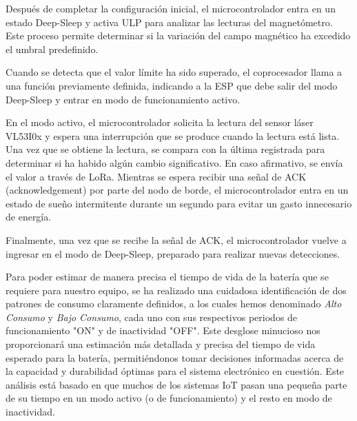 
Después de completar la configuración inicial, el microcontrolador entra en un estado
Deep-Sleep y activa ULP para analizar las lecturas del magnetómetro. Este proceso
permite determinar si la variación del campo magnético ha excedido el umbral predefinido.


Cuando se detecta que el valor límite ha sido superado, el coprocesador llama a una
función previamente definida, indicando a la ESP que debe salir del modo Deep-Sleep y
entrar en modo de funcionamiento activo.

En el modo activo, el microcontrolador solicita la lectura del sensor láser VL53I0x y
espera una interrupción que se produce cuando la lectura está lista. Una vez que se
obtiene la lectura, se compara con la última registrada para determinar si ha habido
algún cambio significativo. En caso afirmativo, se envía el valor a través de LoRa.
Mientras se espera recibir una señal de ACK (acknowledgement) por parte del nodo de
borde, el microcontrolador entra en un estado de sueño intermitente durante un segundo
para evitar un gasto innecesario de energía.

Finalmente, una vez que se recibe la señal de ACK, el microcontrolador vuelve a ingresar
en el modo de Deep-Sleep, preparado para realizar nuevas detecciones.

Para poder estimar de manera precisa el tiempo de vida de la batería que se requiere
para nuestro equipo, se ha realizado una cuidadosa identificación de dos patrones de
consumo claramente definidos, a los cuales hemos denominado \textit{Alto Consumo} y
\textit{Bajo Consumo}, cada uno con sus respectivos periodos de funcionamiento "ON" y de
inactividad "OFF". Este desglose minucioso nos proporcionará una estimación más
detallada y precisa del tiempo de vida esperado para la batería, permitiéndonos tomar
decisiones informadas acerca de la capacidad y durabilidad óptimas para el sistema
electrónico en cuestión. Este análisis está basado en que muchos de los sistemas IoT
pasan una pequeña parte de su tiempo en un modo activo (o de funcionamiento) y el resto
en modo de inactividad.


